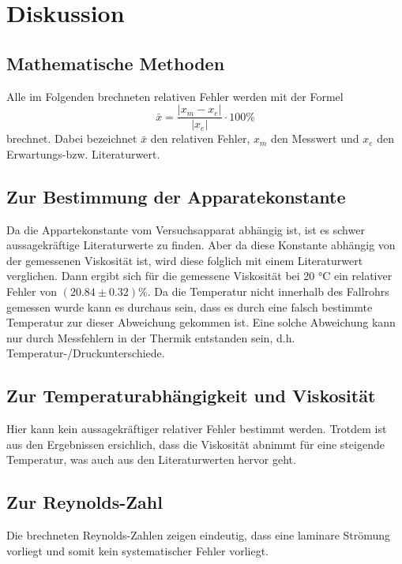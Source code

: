 \section{Diskussion}
\label{sec:Diskussion}
\subsection{Mathematische Methoden}
Alle im Folgenden brechneten relativen Fehler werden mit der Formel
\begin{equation*}
  \bar{x} = \frac{\lvert x_m - x_e \rvert}{\lvert x_e \rvert} \cdot 100 \%
\end{equation*}
brechnet. Dabei bezeichnet $\bar{x}$ den relativen Fehler, $ x_m $ den Messwert
und $x_e$ den Erwartungs-bzw. Literaturwert.
\subsection{Zur Bestimmung der Apparatekonstante}
Da die Appartekonstante vom Versuchsapparat abhängig ist, ist es schwer
aussagekräftige Literaturwerte zu finden. Aber da diese Konstante abhängig
von der gemessenen Viskosität ist, wird diese folglich mit einem Literaturwert
\cite{wiki2} verglichen. Dann ergibt sich für die gemessene Viskosität bei
 20 \si{\celsius} ein relativer Fehler von $(20.84 \pm 0.32)\si{\percent}$.
Da die Temperatur nicht innerhalb des Fallrohrs gemessen wurde kann es durchaus
sein, dass es durch eine falsch bestimmte Temperatur zur dieser Abweichung
gekommen ist. Eine solche Abweichung kann nur durch Messfehlern in der Thermik
entstanden sein, d.h. Temperatur-/Druckunterschiede.
\subsection{Zur Temperaturabhängigkeit und Viskosität}
Hier kann kein aussagekräftiger relativer Fehler bestimmt werden. Trotdem
ist aus den Ergebnissen ersichlich, dass die Viskosität abnimmt für eine steigende
Temperatur, was auch aus den Literaturwerten hervor geht.
\subsection{Zur Reynolds-Zahl}
Die brechneten Reynolds-Zahlen zeigen eindeutig, dass eine laminare Strömung
vorliegt und somit kein systematischer Fehler vorliegt. 
